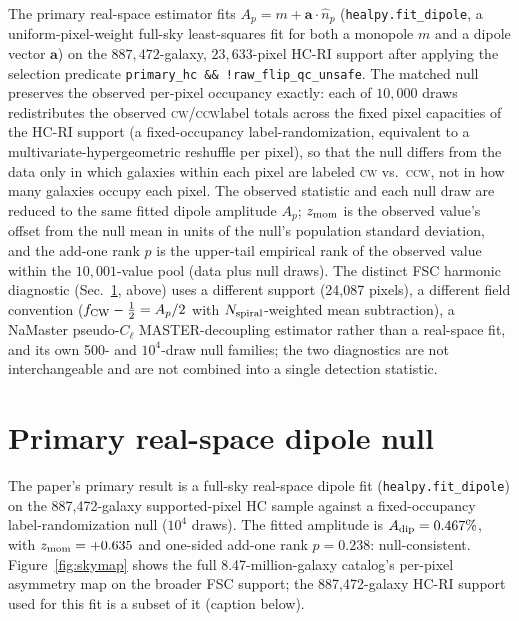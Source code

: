 \documentclass[twocolumn,linenumbers]{aastex702}
\newcommand{\CW}{\textsc{cw}}
\newcommand{\CCW}{\textsc{ccw}}
\newcommand{\HCRI}{\textsc{HC-RI}}
\newcommand{\FSC}{\textsc{FSC}}
\begin{document}
The primary real-space estimator fits $A_p=m+\bm{a}\cdot\hat n_p$
(\texttt{healpy.fit\_dipole}, a uniform-pixel-weight full-sky least-squares
fit for both a monopole $m$ and a dipole vector $\bm{a}$) on the
$887{,}472$-galaxy, $23{,}633$-pixel \HCRI{} support after applying the
selection predicate \texttt{primary\_hc \&\& !raw\_flip\_qc\_unsafe}. The
matched null preserves the observed per-pixel occupancy exactly: each of
$10{,}000$ draws redistributes the observed \CW/\CCW label totals across
the fixed pixel capacities of the \HCRI{} support (a fixed-occupancy
label-randomization, equivalent to a multivariate-hypergeometric
reshuffle per pixel), so that the null differs from the data only in which
galaxies within each pixel are labeled \CW{} vs.\ \CCW, not in how many
galaxies occupy each pixel. The observed statistic and each null draw are
reduced to the same fitted dipole amplitude $A_p$; $z_{\rm mom}$ is the
observed value's offset from the null mean in units of the null's
population standard deviation, and the add-one rank $p$ is the
upper-tail empirical rank of the observed value within the $10{,}001$-value
pool (data plus null draws). The distinct \FSC{} harmonic diagnostic
(Sec.~\ref{sec:dipole}, above) uses a different support (24,087 pixels),
a different field convention ($f_{\rm CW}-\tfrac12=A_p/2$ with
$N_{\rm spiral}$-weighted mean subtraction), a NaMaster pseudo-$C_\ell$
MASTER-decoupling estimator rather than a real-space fit, and its own
500- and $10^4$-draw null families; the two diagnostics are not
interchangeable and are not combined into a single detection statistic.

\section{Primary real-space dipole null}
\label{sec:dipole}

The paper's primary result is a full-sky real-space dipole fit
(\texttt{healpy.fit\_dipole}) on the 887,472-galaxy supported-pixel HC
sample against a fixed-occupancy label-randomization null
($10^4$ draws). The fitted amplitude is
$A_{\rm dip}=0.467\%$, with $z_{\rm mom}=+0.635$ and one-sided add-one rank
$p=0.238$: null-consistent. Figure~\ref{fig:skymap} shows the full
8.47-million-galaxy catalog's per-pixel asymmetry map on the broader \FSC{}
support; the 887,472-galaxy \HCRI{} support used for this fit is a subset
of it (caption below).
\end{document}
